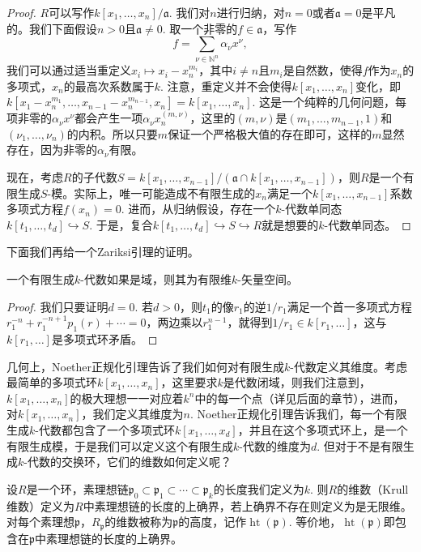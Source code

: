 \begin{proof}
$R$可以写作$k[x_1,\dots,x_n]/\mathfrak a$. 我们对$n$进行归纳，对$n=0$或者$\mathfrak a=0$是平凡的。我们下面假设$n>0$且$\mathfrak a\neq 0$. 取一个非零的$f\in \mathfrak a$，写作
\[
	f=\sum_{\nu \in \mathbb N^n}\alpha_\nu x^\nu,
\]
我们可以通过适当重定义$x_i\mapsto x_i-x_n^{m_i}$，其中$i\neq n$且$m_i$是自然数，使得$f$作为$x_n$的多项式，$x_n$的最高次系数属于$k$. 注意，重定义并不会使得$k[x_1,\dots,x_n]$变化，即$k[x_1-x_n^{m_1},\dots,x_{n-1}-x_n^{m_{n-1}},x_n]=k[x_1,\dots,x_n]$. 这是一个纯粹的几何问题，每项非零的$\alpha_\nu x^\nu$都会产生一项$\alpha_\nu x_n^{(m,\nu)}$，这里的$(m,\nu)$是$(m_1,\dots,m_{n-1},1)$和$(\nu_1,\dots,\nu_n)$的内积。所以只要$m$保证一个严格极大值的存在即可，这样的$m$显然存在，因为非零的$\alpha_\nu$有限。

现在，考虑$R$的子代数$S=k[x_1,\dots,x_{n-1}]/(\mathfrak a\cap k[x_1,\dots,x_{n-1}])$，则$R$是一个有限生成$S$-模。实际上，唯一可能造成不有限生成的$x_n$满足一个$k[x_1,\dots,x_{n-1}]$系数多项式方程$f(x_n)=0$. 进而，从归纳假设，存在一个$k$-代数单同态$k[t_1,\dots,t_d]\hookrightarrow S$. 于是，复合$k[t_1,\dots,t_d]\hookrightarrow S\hookrightarrow R$就是想要的$k$-代数单同态。
\end{proof}

下面我们再给一个Zariksi引理的证明。

\begin{coro}[Zariski引理]
一个有限生成$k$-代数如果是域，则其为有限维$k$-矢量空间。
\end{coro}

\begin{proof}
我们只要证明$d=0$. 若$d>0$，则$t_1$的像$r_1$的逆$1/r_1$满足一个首一多项式方程$r_1^{-n}+r_1^{-n+1}p_1(r)+\cdots=0$，两边乘以$r_1^{n-1}$，就得到$1/r_1\in k[r_1,\dots]$，这与$k[r_1,\dots]$是多项式环矛盾。
\end{proof}

几何上，Noether正规化引理告诉了我们如何对有限生成$k$-代数定义其维度。考虑最简单的多项式环$k[x_1,\dots,x_n]$，这里要求$k$是代数闭域，则我们注意到，$k[x_1,\dots,x_n]$的极大理想一一对应着$k^n$中的每一个点（详见后面的章节），进而，对$k[x_1,\dots,x_n]$，我们定义其维度为$n$. Noether正规化引理告诉我们，每一个有限生成$k$-代数都包含了一个多项式环$k[x_1,\dots,x_d]$，并且在这个多项式环上，是一个有限生成模，于是我们可以定义这个有限生成$k$-代数的维度为$d$. 但对于不是有限生成$k$-代数的交换环，它们的维数如何定义呢？

\begin{para}[维数]
设$R$是一个环，素理想链$\mathfrak p_0\subset \mathfrak p_1\subset \cdots \subset \mathfrak p_k$的长度我们定义为$k$. 则$R$的维数（Krull维数）定义为$R$中素理想链的长度的上确界，若上确界不存在则定义为是无限维。对每个素理想$\mathfrak p$，$R_{\mathfrak p}$的维数被称为$\mathfrak p$的高度，记作$\operatorname{ht}(\mathfrak p)$. 等价地，$\operatorname{ht}(\mathfrak p)$即包含在$\mathfrak p$中素理想链的长度的上确界。
\end{para}


